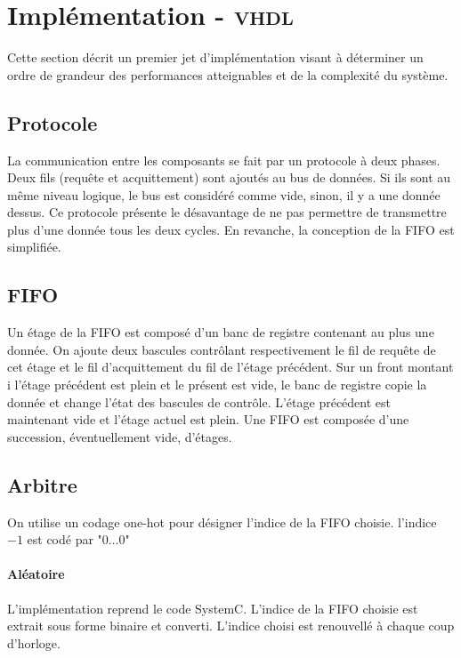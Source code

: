 \section{Implémentation - \textsc{vhdl}}

Cette section décrit un premier jet d'implémentation visant à déterminer un
ordre de grandeur des performances atteignables et de la complexité du système.

\subsection{Protocole}

La communication entre les composants se fait par un protocole à deux phases.
Deux fils (requête et acquittement) sont ajoutés au bus de données. Si ils sont
au même niveau logique, le bus est considéré comme vide, sinon, il y a une
donnée dessus. Ce protocole présente le désavantage de ne pas permettre de
transmettre plus d'une donnée tous les deux cycles. En revanche, la conception
de la FIFO est simplifiée.

\subsection{FIFO}

Un étage de la FIFO est composé d'un banc de registre contenant au plus une
donnée. On ajoute deux bascules contrôlant respectivement le fil de requête de
cet étage et le fil d'acquittement du fil de l'étage précédent. Sur un front
montant i l'étage précédent est plein et le présent est vide, le banc de
registre copie la donnée et change l'état des bascules de contrôle. L'étage
précédent est maintenant vide et l'étage actuel est plein.
Une FIFO est composée d'une succession, éventuellement vide, d'étages.

\subsection{Arbitre}

On utilise un codage one-hot pour désigner l'indice de la FIFO choisie. l'indice
$-1$ est codé par "$0\dots0$"

\paragraph{Aléatoire}

L'implémentation reprend le code SystemC. L'indice de la FIFO choisie est
extrait sous forme binaire et converti. L'indice choisi est renouvellé à chaque
coup d'horloge.

